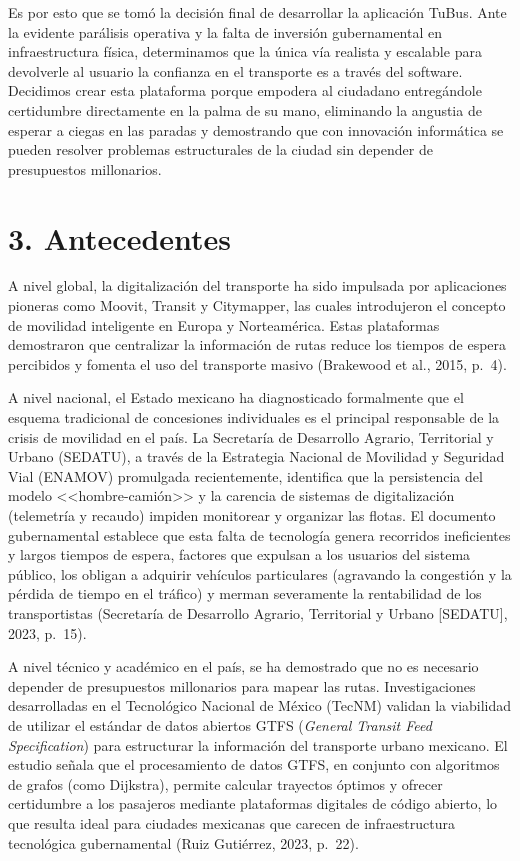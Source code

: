 \documentclass[12pt,letterpaper]{article}
\newcommand{\seccion}[1]{%
  \section*{#1}\addcontentsline{toc}{section}{#1}}
\begin{document}
Es por esto que se tomó la decisión final de desarrollar la aplicación TuBus.
Ante la evidente parálisis operativa y la falta de inversión gubernamental en
infraestructura física, determinamos que la única vía realista y escalable para
devolverle al usuario la confianza en el transporte es a través del software.
Decidimos crear esta plataforma porque empodera al ciudadano entregándole
certidumbre directamente en la palma de su mano, eliminando la angustia de
esperar a ciegas en las paradas y demostrando que con innovación informática se
pueden resolver problemas estructurales de la ciudad sin depender de
presupuestos millonarios.

\seccion{3. Antecedentes}

A nivel global, la digitalización del transporte ha sido impulsada por
aplicaciones pioneras como Moovit, Transit y Citymapper, las cuales
introdujeron el concepto de movilidad inteligente en Europa y Norteamérica.
Estas plataformas demostraron que centralizar la información de rutas reduce
los tiempos de espera percibidos y fomenta el uso del transporte masivo
(Brakewood et al., 2015, p.~4).

A nivel nacional, el Estado mexicano ha diagnosticado formalmente que el
esquema tradicional de concesiones individuales es el principal responsable de
la crisis de movilidad en el país. La Secretaría de Desarrollo Agrario,
Territorial y Urbano (SEDATU), a través de la Estrategia Nacional de Movilidad
y Seguridad Vial (ENAMOV) promulgada recientemente, identifica que la
persistencia del modelo <<hombre-camión>> y la carencia de sistemas de
digitalización (telemetría y recaudo) impiden monitorear y organizar las
flotas. El documento gubernamental establece que esta falta de tecnología
genera recorridos ineficientes y largos tiempos de espera, factores que
expulsan a los usuarios del sistema público, los obligan a adquirir vehículos
particulares (agravando la congestión y la pérdida de tiempo en el tráfico) y
merman severamente la rentabilidad de los transportistas (Secretaría de
Desarrollo Agrario, Territorial y Urbano [SEDATU], 2023, p.~15).

A nivel técnico y académico en el país, se ha demostrado que no es necesario
depender de presupuestos millonarios para mapear las rutas. Investigaciones
desarrolladas en el Tecnológico Nacional de México (TecNM) validan la
viabilidad de utilizar el estándar de datos abiertos GTFS (\textit{General
Transit Feed Specification}) para estructurar la información del transporte
urbano mexicano. El estudio señala que el procesamiento de datos GTFS, en
conjunto con algoritmos de grafos (como Dijkstra), permite calcular trayectos
óptimos y ofrecer certidumbre a los pasajeros mediante plataformas digitales de
código abierto, lo que resulta ideal para ciudades mexicanas que carecen de
infraestructura tecnológica gubernamental (Ruiz Gutiérrez, 2023, p.~22).
\end{document}

